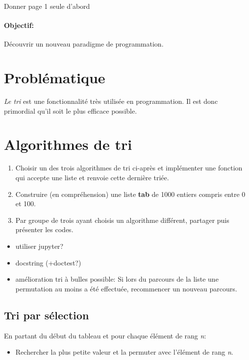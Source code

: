 \documentclass[a4paper,11pt]{article}
\begin{document}
\begin{Form}
\begin{commentprof}
Donner page 1 seule d'abord
\end{commentprof}
\paragraph{Objectif:}Découvrir un nouveau paradigme de programmation.
\section{Problématique}
\emph{Le tri} est une fonctionnalité très utilisée en programmation. Il est donc primordial qu'il soit le plus efficace possible.
\begin{center}
\end{center}
\section{Algorithmes de tri}
\begin{activite}
\begin{enumerate}
\item Choisir un des trois algorithmes de tri ci-après et implémenter une fonction qui accepte une liste et renvoie cette dernière triée.
\item Construire (en compréhension) une liste \textbf{tab} de 1000 entiers compris entre 0 et 100.
\item Par groupe de trois ayant choisis un algorithme différent, partager puis présenter les codes.
\end{enumerate}
\end{activite}
\begin{commentprof}
\begin{itemize}
\item utiliser jupyter?
\item docstring (+doctest?)
\item amélioration tri à bulles possible: Si lors du parcours de la liste une permutation au moins a été effectuée, recommencer un nouveau parcours.
\end{itemize}
\end{commentprof}
\subsection{Tri par sélection}
En partant du début du tableau et pour chaque élément de rang \emph{n}:
\begin{itemize}
\item Rechercher la plus petite valeur et la permuter avec l'élément de rang \emph{n}.
\end{itemize}

\end{Form}
\end{document}
